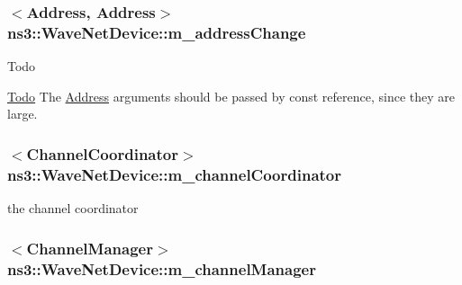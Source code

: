 \subsubsection[{\texorpdfstring{m\+\_\+address\+Change}{m_addressChange}}]{$<${\bf Address}, {\bf Address}$>$ ns3\+::\+Wave\+Net\+Device\+::m\+\_\+address\+Change\hspace{0.3cm}{\ttfamily [private]}}\hypertarget{classns3_1_1WaveNetDevice_a9f5269cddc734b4dddff1e96f577a28f}{}\label{classns3_1_1WaveNetDevice_a9f5269cddc734b4dddff1e96f577a28f}
\begin{DoxyRefDesc}{Todo}
\item[\hyperlink{todo__todo000165}{Todo}]The \hyperlink{classns3_1_1Address}{Address} arguments should be passed by const reference, since they are large. \end{DoxyRefDesc}
\subsubsection[{\texorpdfstring{m\+\_\+channel\+Coordinator}{m_channelCoordinator}}]{$<${\bf Channel\+Coordinator}$>$ ns3\+::\+Wave\+Net\+Device\+::m\+\_\+channel\+Coordinator\hspace{0.3cm}{\ttfamily [private]}}\hypertarget{classns3_1_1WaveNetDevice_ab05beb5d2cd120f6b81ab100628c1912}{}\label{classns3_1_1WaveNetDevice_ab05beb5d2cd120f6b81ab100628c1912}


the channel coordinator 

\subsubsection[{\texorpdfstring{m\+\_\+channel\+Manager}{m_channelManager}}]{$<${\bf Channel\+Manager}$>$ ns3\+::\+Wave\+Net\+Device\+::m\+\_\+channel\+Manager\hspace{0.3cm}{\ttfamily [private]}}\hypertarget{classns3_1_1WaveNetDevice_ae9970c62630b78bc09d4d4a16cb55ff8}{}\label{classns3_1_1WaveNetDevice_ae9970c62630b78bc09d4d4a16cb55ff8}


